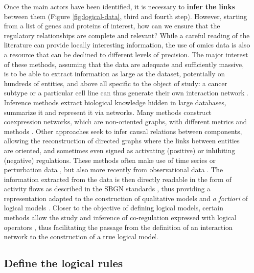 \documentclass[a4paper,12pt,twoside,onecolumn,openright,final,oldfontcommands]{memoir}
\begin{document}
Once the main actors have been identified, it is necessary to
\textbf{infer the links} between them (Figure \ref{fig:logical-data},
third and fourth step). However, starting from a list of genes and
proteins of interest, how can we ensure that the regulatory
relationships are complete and relevant? While a careful reading of the
literature can provide locally interesting information, the use of omics
data is also a resource that can be declined to different levels of
precision. The major interest of these methods, assuming that the data
are adequate and sufficiently massive, is to be able to extract
information as large as the dataset, potentially on hundreds of
entities, and above all specific to the object of study: a cancer
subtype or a particular cell line can thus generate their own
interaction network \citep{lefebvre2010human}. Inference methods extract
biological knowledge hidden in large databases, summarize it and
represent it via networks. Many methods construct coexpression networks,
which are non-oriented graphs, with different metrics and methods
\citep{margolin2006aracne, vert2007new}. Other approaches seek to infer
causal relations between components, allowing the reconstruction of
directed graphs where the links between entities are oriented, and
sometimes even signed as activating (positive) or inhibiting (negative)
regulations. These methods often make use of time series
\citep{hill2016inferring} or perturbation data
\citep{meinshausen2016methods}, but also more recently from
observational data \citep{verny2017learning}. The information extracted
from the data is then directly readable in the form of activity flows as
described in the SBGN standards \citep{novere2009systems}, thus
providing a representation adapted to the construction of qualitative
models and \emph{a fortiori} of logical models
\citep{le2015quantitative}. Closer to the objective of defining logical
models, certain methods allow the study and inference of co-regulation
expressed with logical operators \citep{elati2007licorn}, thus
facilitating the passage from the definition of an interaction network
to the construction of a true logical model.

\subsection{Define the logical rules}\label{define-the-logical-rules}
\end{document}
